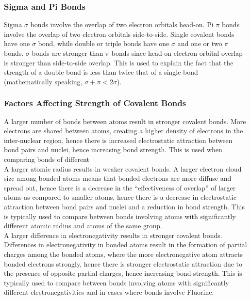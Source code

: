 \documentclass[../main]{subfiles}
\begin{document}
	\subsubsection{Sigma and Pi Bonds}

	Sigma \(\sigma\) bonds involve the overlap of two electron orbitals head-on. Pi \(\pi\) bonds involve the overlap of two electron orbitals side-to-side. Single covalent bonds have one \(\sigma\) bond, while double or triple bonds have one \(\sigma\) and one or two \(\pi\) bonds. \(\sigma\) bonds are stronger than \(\pi\) bonds since head-on electron orbital overlap is stronger than side-to-side overlap. This is used to explain the fact that the strength of a double bond is less than twice that of a single bond (mathematically speaking, \( \sigma + \pi < 2\sigma \)).

	\subsubsection{Factors Affecting Strength of Covalent Bonds}


	A larger number of bonds between atoms result in stronger covalent bonds. More electrons are shared between atoms, creating a higher density of electrons in the inter-nuclear region, hence there is increased electrostatic attraction between bond pairs and nuclei, hence increasing bond strength. This is used when comparing bonds of different\\

	A larger atomic radius results in weaker covalent bonds. A larger electron cloud size among bonded atoms means that bonded electrons are more diffuse and spread out, hence there is a decrease in the ``effectiveness of overlap'' of larger atoms as compared to smaller atoms, hence there is a decrease in electrostatic attraction between bond pairs and nuclei and a reduction in bond strength. This is typically used to compare between bonds involving atoms with significantly different atomic radius and atoms of the same group. \\

	A larger difference in electronegativity results in stronger covalent bonds. Differences in electronegativity in bonded atoms result in the formation of partial charges among the bonded atoms, where the more electronegative atom attracts bonded electrons strongly, hence there is stronger electrostatic attraction due to the presence of opposite partial charges, hence increasing bond strength. This is typically used to compare between bonds involving atoms with significantly different electronegativities and in cases where bonds involve Fluorine.
\end{document}
